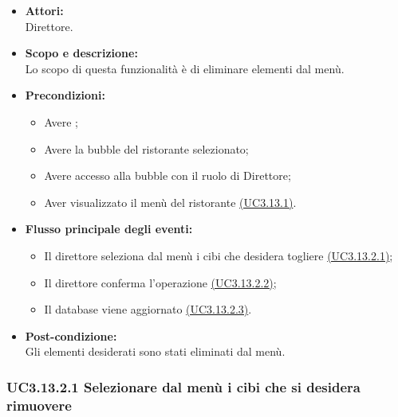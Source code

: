 \begin{itemize}
	\item \textbf{Attori:}
	\\Direttore.
	\item \textbf{Scopo e descrizione:} 
	\\Lo scopo di questa funzionalità è di eliminare elementi dal menù.
	\item \textbf{Precondizioni:}
	\begin{itemize}
		\item Avere ;
		\item Avere la bubble del ristorante selezionato;
		\item Avere accesso alla bubble con il ruolo di Direttore;
		\item Aver visualizzato il menù del ristorante \hyperref[UC3.13.1]{(UC3.13.1)}.
	\end{itemize}
	\item \textbf{Flusso principale degli eventi:}
	\begin{itemize}
		\item Il direttore seleziona dal menù i cibi che desidera togliere \hyperref[UC3.13.2.1]{(UC3.13.2.1)};
		\item Il direttore conferma l’operazione \hyperref[UC3.13.2.2]{(UC3.13.2.2)};
		\item Il database viene aggiornato \hyperref[UC3.13.2.3]{(UC3.13.2.3)}.
	\end{itemize}
	\item \textbf{Post-condizione:}
	\\Gli elementi desiderati sono stati eliminati dal menù.
\end{itemize}

\subsubsection{UC3.13.2.1 Selezionare dal menù i cibi che si desidera rimuovere} \label{UC3.13.2.1}

